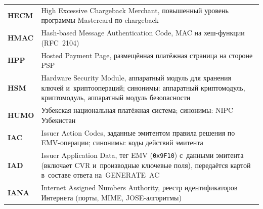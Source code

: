 \begin{longtable}{@{}p{4.5em}p{\dimexpr\linewidth-4.5em-2\tabcolsep\relax}@{}}
  \textbf{HECM}              & High Excessive Chargeback Merchant, повышенный уровень программы Mastercard по chargeback                                                                                                                                                                                                        \\
  \textbf{HMAC}              & Hash-based Message Authentication Code, MAC на хеш-функции (RFC~2104)                                                                                                                                                                                                                            \\
  \textbf{HPP}               & Hosted Payment Page, размещённая платёжная страница на стороне PSP                                                                                                                                                                                                                               \\
  \textbf{HSM}               & Hardware Security Module, аппаратный модуль для хранения ключей и~криптоопераций; синонимы: аппаратный криптомодуль, криптомодуль, аппаратный модуль безопасности                                                                                                                                \\
  \textbf{HUMO}              & Узбекская национальная платёжная система; синонимы: NIPC Узбекистан                                                                                                                                                                                                                              \\
  \textbf{IAC}               & Issuer Action Codes, заданные эмитентом правила решения по EMV-операции; синонимы: коды действий эмитента                                                                                                                                                                                        \\
  \textbf{IAD}               & Issuer Application Data, тег EMV (\texttt{0x9F10}) с~данными эмитента (включает CVR и~производные ключевые поля), передаётся картой в~составе ответа на~GENERATE~AC                                                                                                                              \\
  \textbf{IANA}              & Internet Assigned Numbers Authority, реестр идентификаторов Интернета (порты, MIME, JOSE-алгоритмы)                                                                                                                                                                                              \\

\end{longtable}

